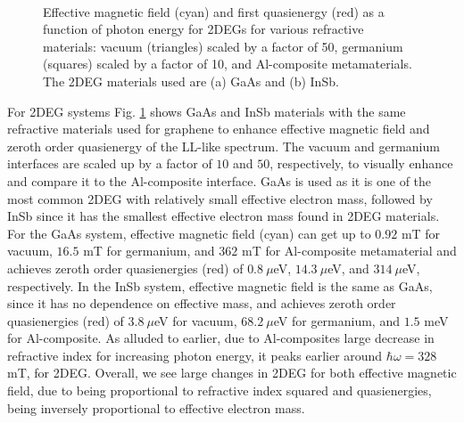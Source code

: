 \documentclass[aps,prb,twocolumn,showpacs,superscriptaddress]{revtex4-2}
\begin{document}
\begin{figure}[h]
  \\
  \caption{Effective magnetic field (cyan) and first quasienergy (red) as a function of photon energy for 2DEGs for various refractive materials: vacuum (triangles) scaled by a factor of 50, germanium (squares) scaled by a factor of 10, and Al-composite metamaterials. The 2DEG materials used are (a) GaAs and (b) InSb.}
  \label{fig:2deg-bfield-energy}
\end{figure}

For 2DEG systems Fig. \ref{fig:2deg-bfield-energy} shows GaAs and InSb materials with the same refractive materials used for graphene to enhance effective magnetic field and zeroth order quasienergy of the LL-like spectrum.
The vacuum and germanium interfaces are scaled up by a factor of $10$ and $50$, respectively, to visually enhance and compare it to the Al-composite interface.
GaAs is used as it is one of the most common 2DEG with relatively small effective electron mass, followed by InSb since it has the smallest effective electron mass found in 2DEG materials.
For the GaAs system, effective magnetic field (cyan) can get up to $0.92$ mT for vacuum, $16.5$ mT for germanium, and $362$ mT for Al-composite metamaterial and achieves zeroth order quasienergies (red) of $0.8\ \mu$eV, $14.3\ \mu$eV, and $314\ \mu$eV, respectively.
In the InSb system, effective magnetic field is the same as GaAs, since it has no dependence on effective mass, and achieves zeroth order quasienergies (red) of $3.8\ \mu$eV for vacuum, $68.2\ \mu$eV for germanium, and $1.5$ meV for Al-composite.
As alluded to earlier, due to Al-composites large decrease in refractive index for increasing photon energy, it peaks earlier around $\hbar\omega=328$ mT, for 2DEG.
Overall, we see large changes in 2DEG for both effective magnetic field, due to being proportional to refractive index squared and quasienergies, being inversely proportional to effective electron mass.
\end{document}
